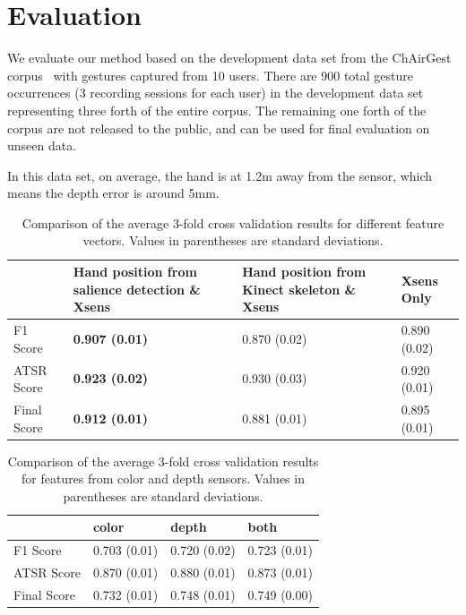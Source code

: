 \chapter{Evaluation}
We evaluate our method based on the development data set from the ChAirGest
corpus~\cite{Ruffieux2013} with gestures captured from 10 users. There are 900
total gesture occurrences (3 recording sessions for each user) in the
development data set representing three forth of the entire corpus. The remaining one forth of the corpus are not released to
the public, and can be used for final evaluation on unseen data.

In this data set, on average, the hand is at 1.2m away
from the sensor, which means the depth error is around 5mm.

\begin{table}[h]
\begin{center}
\begin{tabular}{|l|p{2cm}|p{1.7cm}|p{1.7cm}|}
\hline
 & Hand position from salience detection \& Xsens & Hand position
 from Kinect skeleton \& Xsens & Xsens Only \\
\hline
F1 Score & \textbf{0.907 (0.01)} & 0.870 (0.02) & 0.890 (0.02) \\
\hline
ATSR Score & \textbf{0.923 (0.02)} & 0.930 (0.03) & 0.920 (0.01) \\
\hline
Final Score & \textbf{0.912 (0.01)} & 0.881 (0.01) & 0.895 (0.01) \\
\hline
\end{tabular}
\caption{Comparison of the average 3-fold cross validation results for different
feature vectors. Values in parentheses are standard deviations.}
\label{tab:comp-feature}
\end{center}
\end{table}

\begin{table}[h]
\begin{center}
\begin{tabular}{|l|p{2cm}|p{1.7cm}|p{1.7cm}|}
\hline
 & color & depth & both \\
\hline
F1 Score & 0.703 (0.01) & 0.720 (0.02) & 0.723 (0.01) \\
\hline
ATSR Score & 0.870 (0.01) & 0.880 (0.01) & 0.873 (0.01) \\
\hline
Final Score & 0.732 (0.01) & 0.748 (0.01) & 0.749 (0.00) \\
\hline
\end{tabular}
\caption{Comparison of the average 3-fold cross validation results for
features from color and depth sensors. Values in parentheses are standard
deviations.}
\label{tab:comp-feature}
\end{center}
\end{table}

